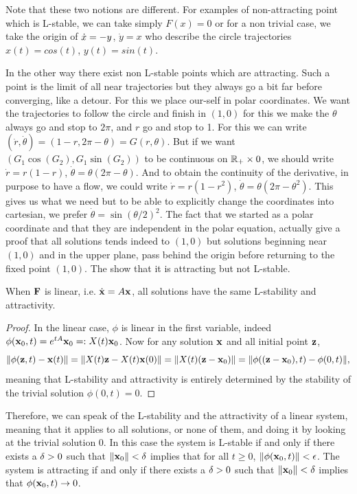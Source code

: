 \begin{remarque} \label{rem:stabilité}
Note that these two notions are different. For examples of non-attracting point which is L-stable, we can take simply $F(x)=0$ or for a non trivial case, we take the origin of $\dot{x} = -y$, $\dot{y} = x$ who describe the circle trajectories $x(t)=cos(t)$, $y(t)=sin(t)$.

In the other way there exist non L-stable points which are attracting. Such a point is the limit of all near trajectories but they always go a bit far before converging, like a detour. For this we place our-self in polar coordinates. We want the trajectories to follow the circle and finish in $(1,0)$ for this we make the $\theta$ always go and stop to $2\pi$, and $r$ go and stop to 1. For this we can write $(\dot{r},\dot{\theta})=(1-r,2\pi-\theta) = G(r,\theta)$. But if we want $(G_1\cos(G_2),G_1\sin(G_2))$ to be continuous on $\mathbb{R}_+\times 0$, we should write $\dot{r} = r(1-r)$, $\dot{\theta} = \theta(2\pi-\theta)$. And to obtain the continuity of the derivative, in purpose to have a flow, we could write $\dot{r} = r(1-r^2)$, $\dot{\theta} = \theta(2\pi-\theta^2)$. This gives us what we need but to be able to explicitly change the coordinates into cartesian, we prefer $\dot{\theta} = \sin(\theta/2)^2$. The fact that we started as a polar coordinate and that they are independent in the polar equation, actually give a proof that all solutions tends indeed to $(1,0)$ but solutions beginning near $(1,0)$ and in the upper plane, pass behind the origin before returning to the fixed point $(1,0)$. The show that it is attracting but not L-stable. 
\end{remarque}
\begin{lemme}
    When $\mathbf{F}$ is linear, i.e. $\dot{\mathbf{x}}=A\mathbf{x}$, all solutions have the same L-stability and attractivity.
\end{lemme}
\begin{proof}
In the linear case, $\phi$ is linear in the first variable, indeed $\phi(\mathbf{x}_0,t) = e^{tA}\mathbf{x}_0 =: X(t)\mathbf{x}_0$. Now for any solution $\mathbf{x}$ and all initial point $\mathbf{z}$,
\[ \|\phi(\mathbf{z},t)-\mathbf{x}(t)\| = \|X(t)\mathbf{z}-X(t)\mathbf{x}(0)\| = \|X(t)(\mathbf{z}-\mathbf{x}_0)\| =\|\phi((\mathbf{z}-\mathbf{x}_0),t)-\phi(0,t)\|, \] meaning that L-stability and attractivity is entirely determined by the stability of the trivial solution $\phi(0,t)=0$.
\end{proof}
\begin{remarque}
    Therefore, we can speak of the L-stability and the attractivity of a linear system, meaning that it applies to all solutions, or none of them, and doing it by looking at the trivial solution 0. In this case the system is L-stable if and only if there exists a $\delta>0$ such that $\|\mathbf{x}_0\|<\delta$ implies that for all $t\geq0$, $\|\phi(\mathbf{x}_0,t)\|<\epsilon$. The system is attracting if and only if there exists a $\delta>0$ such that $\|\mathbf{x}_0\|<\delta$ implies that $\phi(\mathbf{x}_0,t) \to 0$.
\end{remarque}
 
